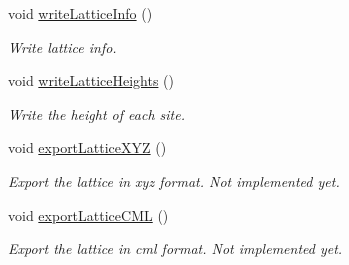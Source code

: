 \begin{DoxyCompactItemize}
\item 
\mbox{\label{classIO_a097e7b662d3c34941ffd8701a0870aa1}} 
void \mbox{\hyperlink{classIO_a097e7b662d3c34941ffd8701a0870aa1}{write\+Lattice\+Info}} ()
\begin{DoxyCompactList}\small\item\em Write lattice info. \end{DoxyCompactList}\item 
\mbox{\label{classIO_a030b090eaf223c80e34333b78e3c1830}} 
void \mbox{\hyperlink{classIO_a030b090eaf223c80e34333b78e3c1830}{write\+Lattice\+Heights}} ()
\begin{DoxyCompactList}\small\item\em Write the height of each site. \end{DoxyCompactList}\item 
\mbox{\label{classIO_aafa964233c1f238062a3234b809ac392}} 
void \mbox{\hyperlink{classIO_aafa964233c1f238062a3234b809ac392}{export\+Lattice\+X\+YZ}} ()
\begin{DoxyCompactList}\small\item\em Export the lattice in xyz format. Not implemented yet. \end{DoxyCompactList}\item 
\mbox{\label{classIO_ac76b42f8d8e4cab930d75a272ac2d7be}} 
void \mbox{\hyperlink{classIO_ac76b42f8d8e4cab930d75a272ac2d7be}{export\+Lattice\+C\+ML}} ()
\begin{DoxyCompactList}\small\item\em Export the lattice in cml format. Not implemented yet. \end{DoxyCompactList}\end{DoxyCompactItemize}
